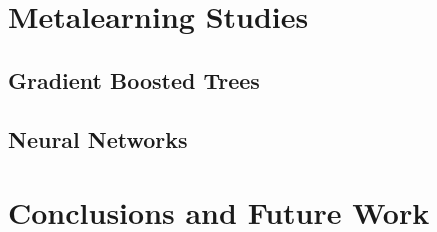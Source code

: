 \documentclass{article}
\begin{document}
\section{Metalearning Studies}

\subsection{Gradient Boosted Trees}

\subsection{Neural Networks}


\section{Conclusions and Future Work}


\printbibliography
\end{document}

